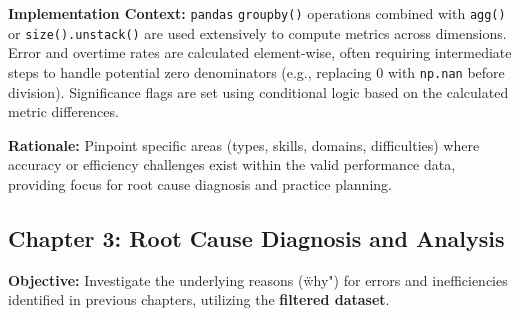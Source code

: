 \documentclass{article}
\begin{document}
\textbf{Implementation Context:} \texttt{pandas} \texttt{groupby()} operations combined with \texttt{agg()} or \texttt{size().unstack()} are used extensively to compute metrics across dimensions. Error and overtime rates are calculated element-wise, often requiring intermediate steps to handle potential zero denominators (e.g., replacing 0 with \texttt{np.nan} before division). Significance flags are set using conditional logic based on the calculated metric differences.

\textbf{Rationale:} Pinpoint specific areas (types, skills, domains, difficulties) where accuracy or efficiency challenges exist within the valid performance data, providing focus for root cause diagnosis and practice planning.

\subsection{Chapter 3: Root Cause Diagnosis and Analysis}

\textbf{Objective:} Investigate the underlying reasons (\"why") for errors and inefficiencies identified in previous chapters, utilizing the \textbf{filtered dataset}.
\end{document}
